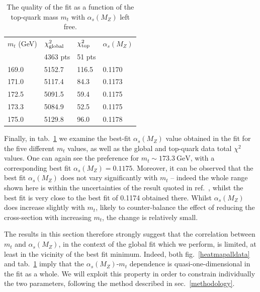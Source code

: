 \documentclass[sn-mathphys]{sn-jnl}%
\newcommand{\mt}{m_t}
\newcommand{\as}{\alpha_s(M_Z)}
\newcommand{\gev}{\mathrm{GeV}}
\begin{document}
\begin{table}[ht!]
\begin{center}
\renewcommand\arraystretch{1.25}
\begin{tabular}{|l|l|l|l|}
\hline
   $\mt$ (GeV)       &  $\chi^2_{\rm global}$  &   $\chi^2_{\rm top}$ &  
$\as$        \\
          &  4363 pts &  51 pts &  \\
\hline
169.0   &  5152.7  & 116.5   & 0.1170     \\
171.0   &  5117.4  & 84.3   & 0.1173     \\
172.5   &  5091.5 & 59.4   & 0.1175     \\
173.3  & 5084.9  & 52.5  & 0.1175   \\
175.0  & 5129.8  &  96.0  &  0.1178  \\
\hline
    \end{tabular}
\end{center}

\caption{The quality of the fit as a function of the top-quark mass $\mt$ with $\as$
left free.}
\label{mtasfree}   
\end{table}

Finally, in tab.~\ref{mtasfree} we examine the best-fit $\as$ value obtained in the fit for the five different $\mt$ values, as well as the global and top-quark data total $\chi^2$ values. One can again see the preference for $\mt \sim 173.3~\gev$, with a corresponding best fit $\as=0.1175$. Moreover, it can be observed that the best fit $\as$ does not vary significantly with $\mt$ -- indeed the whole range shown here is within the uncertainties of the result quoted in ref.~\cite{Cridge:2021qfd}, whilst the best fit is very close to the best fit of 0.1174 obtained there. Whilst $\as$ does increase slightly with $\mt$, likely to counter-balance the effect of reducing the cross-section with increasing $\mt$, the change is relatively small.

The results in this section therefore strongly suggest that the correlation between $\mt$ and $\as$, in the context of the global fit which we perform, is limited,  at least in the vicinity of the best fit minimum. Indeed, both fig.~\ref{heatmapalldata} and tab.~\ref{mtasfree} imply that the $\as$-$\mt$ dependence is quasi-one-dimensional in the fit as a whole. We will exploit this property in order to constrain individually the two parameters, following the method described in sec.~\ref{methodology}. 
\end{document}
